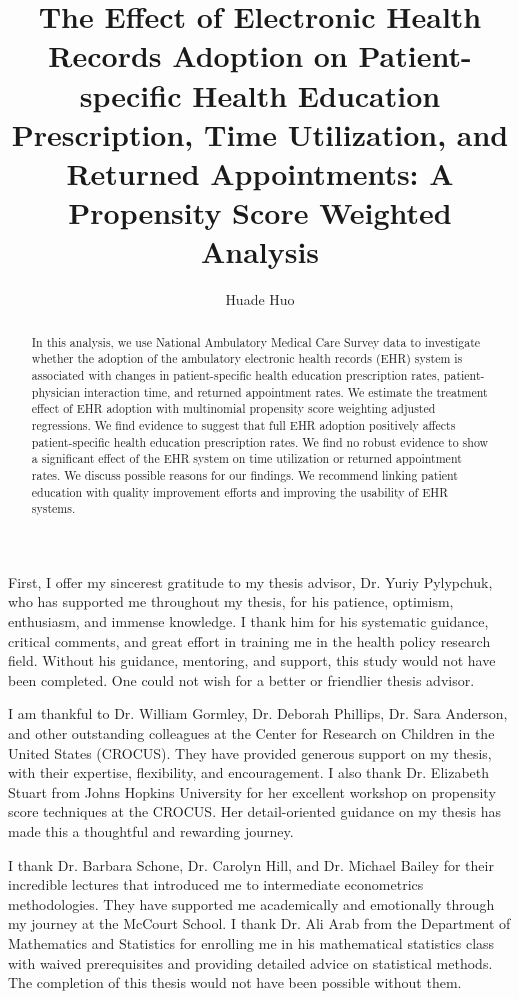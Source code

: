 \documentclass[12pt]{report}
\title{The Effect of Electronic Health Records Adoption
on Patient-specific Health Education Prescription, Time Utilization, and Returned Appointments: A Propensity Score Weighted Analysis}
\author{Huade Huo}
\begin{document}

\maketitle    %

\begin{abstract}
In this analysis, we use National Ambulatory Medical Care Survey data to investigate whether the adoption of the ambulatory electronic health records (EHR) system is associated with changes in patient-specific health education prescription rates, patient-physician interaction time, and returned appointment rates. We estimate the treatment effect of EHR adoption with multinomial propensity score weighting adjusted regressions. We find evidence to suggest that full EHR adoption positively affects patient-specific health education prescription rates. We find no robust evidence to show a significant effect of the EHR system on time utilization or returned appointment rates. We discuss possible reasons for our findings. We recommend linking patient education with quality improvement efforts and improving the usability of EHR systems.
\end{abstract}



First, I offer my sincerest gratitude to my thesis advisor, Dr. Yuriy Pylypchuk, who has supported me throughout my thesis, for his patience, optimism, enthusiasm, and immense knowledge. I thank him for his systematic guidance, critical comments, and great effort in training me in the health policy research field. Without his guidance, mentoring, and support, this study would not have been completed. One could not wish for a better or friendlier thesis advisor.

I am thankful to Dr. William Gormley, Dr. Deborah Phillips, Dr. Sara Anderson, and other outstanding colleagues at the Center for Research on Children in the United States (CROCUS). They have provided generous support on my thesis, with their expertise, flexibility, and encouragement. I also thank Dr. Elizabeth Stuart from Johns Hopkins University for her excellent workshop on propensity score techniques at the CROCUS. Her detail-oriented guidance on my thesis has made this a thoughtful and rewarding journey.

I thank Dr. Barbara Schone, Dr. Carolyn Hill, and Dr. Michael Bailey for their incredible lectures that introduced me to intermediate econometrics methodologies. They have supported me academically and emotionally through my journey at the McCourt School. I thank Dr. Ali Arab from the Department of Mathematics and Statistics for enrolling me in his mathematical statistics class with waived prerequisites and providing detailed advice on statistical methods. The completion of this thesis would not have been possible without them.
\end{document}
